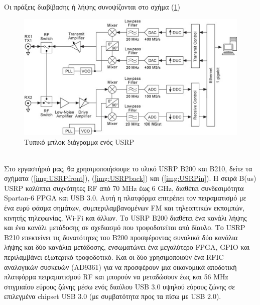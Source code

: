 \documentclass[12pt]{report}
\begin{document}
            Οι πράξεις διαβίβασης ή λήψης συνοψίζονται στο σχήμα (\ref*{fig:USRPblock})
            \begin{figure}[ht]
                \centering
                \includegraphics[width=.7\textwidth]{USRPblock.png}
                \caption{Τυπικό μπλοκ διάγραμμα ενός USRP}
                \label{fig:USRPblock}
            \end{figure}\\

            Στο εργαστήριό μας, θα χρησιμοποιήσουμε το υλικό USRP B200 και B210, 
            δείτε τα σχήματα (\ref{img:USRPfront}), (\ref{img:USRPback}) και 
            (\ref{img:USRPin}).
            Η σειρά B(us) USRP καλύπτει συχνότητες RF από 70 MHz έως 6 GHz, διαθέτει
            συνδεσιμότητα Spartan-6 FPGA και USB 3.0. 
            Αυτή η πλατφόρμα επιτρέπει τον πειραματισμό με ένα ευρύ φάσμα σημάτων,
            συμπεριλαμβανομένων FM και τηλεοπτικών εκπομπών, κινητής τηλεφωνίας, 
            Wi-Fi και άλλων. Το USRP B200 διαθέτει ένα κανάλι λήψης και ένα κανάλι μετάδοσης
            σε σχεδιασμό που τροφοδοτείται από δίαυλο. 
            Το USRP B210 επεκτείνει τις δυνατότητες του B200 προσφέροντας συνολικά δύο 
            κανάλια λήψης και δύο κανάλια μετάδοσης, ενσωματώνει ένα μεγαλύτερο FPGA,
            GPIO και περιλαμβάνει εξωτερικό τροφοδοτικό. Και οι δύο χρησιμοποιούν ένα RFIC
            αναλογικών συσκευών (AD9361) για να προσφέρουν μια οικονομικά αποδοτική 
            πλατφόρμα πειραματισμού RF και μπορούν να μεταδώσουν έως και 56 MHz στιγμιαίου
            εύρους ζώνης μέσω ενός διαύλου USB 3.0 υψηλού εύρους ζώνης σε επιλεγμένα 
            chipset USB 3.0 (με συμβατότητα προς τα πίσω με USB 2.0).
\end{document}
